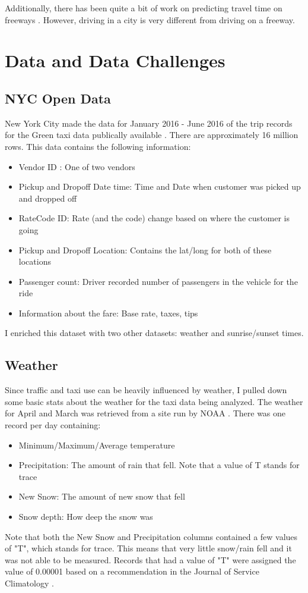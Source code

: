 \documentclass[conference]{IEEEtran}
\begin{document}
Additionally, there has been quite a bit of work on predicting travel time on freeways \cite{freewayca} \cite{highway}.  However, driving in a city is very different from driving on a freeway.


\section{Data and Data Challenges}
 

\subsection{NYC Open Data}
New York City made the data for January 2016 - June 2016 of the trip records for the Green taxi data publically available \cite{green2016}. There are approximately 16 million rows.  This data contains the following information:
\begin{itemize}
\item{Vendor ID : One of two vendors}
\item{Pickup and Dropoff Date time: Time and Date when customer was picked up and dropped off}
\item{RateCode ID: Rate (and the code) change based on where the customer is going}
\item{Pickup and Dropoff Location: Contains the lat/long for both of these locations}
\item{Passenger count: Driver recorded number of passengers in the vehicle for the ride}
\item{Information about the fare: Base rate, taxes, tips}
\end{itemize}

I enriched this dataset with two other datasets: weather and sunrise/sunset times.

\subsection{Weather}
Since traffic and taxi use can be heavily influenced by weather, I pulled down some basic stats about the weather for the taxi data being analyzed. The weather for April and March was retrieved from a site run by NOAA \cite{weather}.  There was one record per day containing:
 \begin{itemize}
\item{Minimum/Maximum/Average temperature}
\item{Precipitation: The amount of rain that fell.  Note that a value of T stands for trace}
\item{New Snow: The amount of new snow that fell}
\item{Snow depth: How deep the snow was}
\end{itemize}
Note that both the New Snow and Precipitation columns contained a few values of "T", which stands for trace.  This means that very little snow/rain fell and it was not able to be measured.  Records that had a value of "T" were assigned the value of 0.00001 based on a recommendation in the Journal of Service Climatology \cite{trace}.
\end{document}
